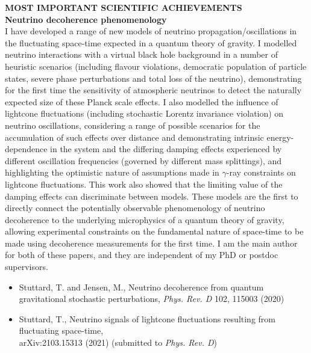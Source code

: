 \documentclass[a4paper,11pt]{article}
\renewcommand{\smallskip} {\vspace{0.1in}}
\begin{document}
\textbf{MOST IMPORTANT SCIENTIFIC ACHIEVEMENTS ~~\hrulefill}\smallskip\\
%
{\bf Neutrino decoherence phenomenology} \\ 
I have developed a range of new models of neutrino propagation/oscillations in the fluctuating space-time expected in a quantum theory of gravity. I modelled neutrino interactions with a virtual black hole background in a number of heuristic scenarios  (including flavour violations, democratic population of particle states, severe phase perturbations and total loss of the neutrino), demonstrating for the first time the sensitivity of atmospheric neutrinos to detect the naturally expected size of these Planck scale effects. I also modelled the influence of lightcone fluctuations (including stochastic Lorentz invariance violation) on neutrino oscillations, considering a range of possible scenarios for the accumulation of such effects over distance and demonstrating intrinsic energy-dependence in the system and the differing damping effects experienced by different oscillation frequencies (governed by different mass splittings), and highlighting the optimistic nature of assumptions made in $\gamma$-ray constraints on lightcone fluctuations. This work also showed that the limiting value of the damping effects can discriminate between models. These models are the first to directly connect the potentially observable phenomenology of neutrino decoherence to the underlying microphysics of a quantum theory of gravity, allowing experimental constraints on the fundamental nature of space-time to be made using decoherence measurements for the first time. I am the main author for both of these papers, and they are independent of my PhD or postdoc supervisors.

\begin{itemize}
  \item Stuttard, T. and Jensen, M., Neutrino decoherence from quantum gravitational stochastic perturbations, \textit{Phys. Rev. D} 102, 115003 (2020)
  \item Stuttard, T., Neutrino signals of lightcone fluctuations resulting from fluctuating space-time, \\ arXiv:2103.15313 (2021) (submitted to \textit{Phys. Rev. D})
\end{itemize}

\vspace{0.2cm}
\end{document}
